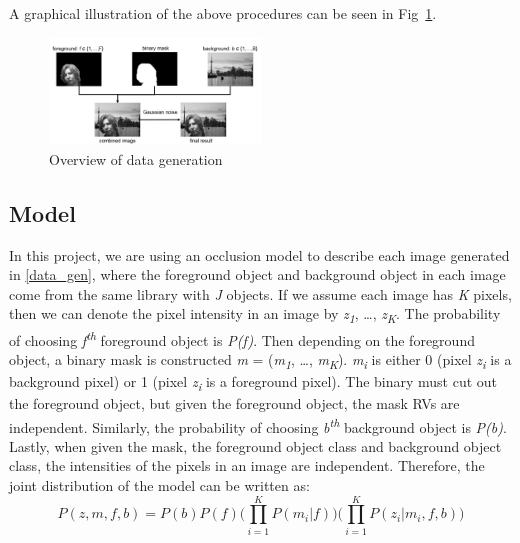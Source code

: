 \documentclass{article} %
\begin{document}
A graphical illustration of the above procedures can be seen in Fig~\ref{fig:data_generation}.

\begin{figure}[h]
\begin{center}
\includegraphics[width=0.5\textwidth]{data_generation}
\end{center}
\caption{Overview of data generation}
\label{fig:data_generation}
\end{figure}

\subsection{Model}
\label{model}
In this project, we are using an occlusion model to describe each image generated in \ref{data_gen}, where the foreground object and background object in each image come from the same library with \textit{J} objects. If we assume each image has \textit{K} pixels, then we can denote the pixel intensity in an image by \textit{z}\textsubscript{\textit{1}}, \ldots , \textit{z}\textsubscript{\textit{K}}. The probability of choosing \textit{f}\textsuperscript{\textit{th}} foreground object is \textit{P(f)}. Then depending on the foreground object, a binary mask is constructed \textit{m} = (\textit{m}\textsubscript{\textit{1}}, \ldots, \textit{m}\textsubscript{\textit{K}}). \textit{m}\textsubscript{\textit{i}} is either 0 (pixel \textit{z}\textsubscript{\textit{i}} is a background pixel) or 1 (pixel \textit{z}\textsubscript{\textit{i}} is a foreground pixel). The binary must cut out the foreground object, but given the foreground object, the mask RVs are independent. Similarly, the probability of choosing \textit{b}\textsuperscript{\textit{th}} background object is \textit{P(b)}. Lastly, when given the mask, the foreground object class and background object class, the intensities of the pixels in an image are independent. Therefore, the joint distribution of the model can be written as:
\begin{equation}
P(z,m,f,b) = P(b)P(f)\Bigg( \prod_{i=1}^KP(m_{i}|f)\Bigg)\Bigg( \prod_{i=1}^KP(z_{i}|m_{i},f,b)\Bigg)
\label{eq:eq1}
\end{equation}
\end{document}
